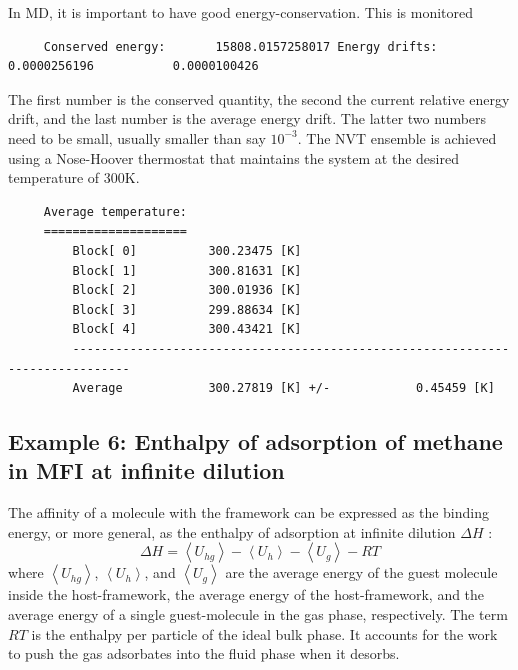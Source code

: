 In MD, it is important to have good energy-conservation. This is monitored
\begin{tiny}
\begin{verbatim}
     Conserved energy:       15808.0157258017 Energy drifts:  0.0000256196           0.0000100426
\end{verbatim}
\end{tiny}
The first number is the conserved quantity, the second the current relative energy drift, and the last number is the average energy drift.
The latter two numbers need to be small, usually smaller than say $10^{-3}$. 
The NVT ensemble is achieved using a Nose-Hoover thermostat that maintains the system at the desired temperature of 300K.
\begin{tiny}
\begin{verbatim}
     Average temperature:
     ====================
         Block[ 0]          300.23475 [K]
         Block[ 1]          300.81631 [K]
         Block[ 2]          300.01936 [K]
         Block[ 3]          299.88634 [K]
         Block[ 4]          300.43421 [K]
         ------------------------------------------------------------------------------
         Average            300.27819 [K] +/-            0.45459 [K]
\end{verbatim}
\end{tiny}

\subsection*{Example 6: Enthalpy of adsorption of methane in MFI at infinite dilution}

The affinity of a molecule with the framework can be expressed as the binding energy, or more general, as the enthalpy of adsorption
at infinite dilution $\Delta H$ \cite{Wood1988}:
\begin{equation}
 \Delta H = \left\langle U_{hg}\right\rangle - \left\langle U_{h}\right\rangle - \left\langle U_{g}\right\rangle - RT
\end{equation}
where $\left\langle U_{hg}\right\rangle$, $\left\langle U_{h}\right\rangle$, and $\left\langle U_{g}\right\rangle$
are the average energy of the guest molecule inside the host-framework, the average energy of the host-framework, and
the average energy of a single guest-molecule in the gas phase, respectively.
The term $RT$ is the enthalpy per particle of the ideal bulk phase.
It accounts for the work to push the gas adsorbates into the fluid phase when it desorbs.

